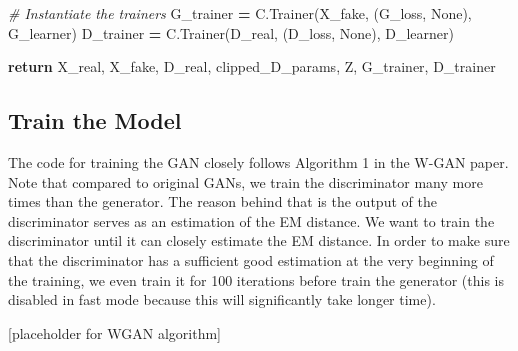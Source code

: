 \documentclass[]{book}
\newenvironment{Shaded}{\begin{snugshade}}{\end{snugshade}}
\newcommand{\CommentTok}[1]{\textcolor[rgb]{0.56,0.35,0.01}{\textit{#1}}}
\newcommand{\VariableTok}[1]{\textcolor[rgb]{0.00,0.00,0.00}{#1}}
\newcommand{\ControlFlowTok}[1]{\textcolor[rgb]{0.13,0.29,0.53}{\textbf{#1}}}
\newcommand{\OperatorTok}[1]{\textcolor[rgb]{0.81,0.36,0.00}{\textbf{#1}}}
\newcommand{\NormalTok}[1]{#1}
\theoremstyle{definition}
\theoremstyle{definition}
\theoremstyle{definition}
\theoremstyle{remark}
\begin{document}
\begin{Shaded}
\begin{Highlighting}[]
    \CommentTok{# Instantiate the trainers}
\NormalTok{    G_trainer }\OperatorTok{=}\NormalTok{ C.Trainer(X_fake,}
\NormalTok{                        (G_loss, }\VariableTok{None}\NormalTok{),}
\NormalTok{                        G_learner)}
\NormalTok{    D_trainer }\OperatorTok{=}\NormalTok{ C.Trainer(D_real,}
\NormalTok{                        (D_loss, }\VariableTok{None}\NormalTok{),}
\NormalTok{                        D_learner)}

    \ControlFlowTok{return}\NormalTok{ X_real, X_fake, D_real, clipped_D_params, Z, G_trainer, D_trainer}
\end{Highlighting}
\end{Shaded}

\subsection{Train the Model}\label{train-the-model}

The code for training the GAN closely follows Algorithm 1 in the W-GAN
paper. Note that compared to original GANs, we train the discriminator
many more times than the generator. The reason behind that is the output
of the discriminator serves as an estimation of the EM distance. We want
to train the discriminator until it can closely estimate the EM
distance. In order to make sure that the discriminator has a sufficient
good estimation at the very beginning of the training, we even train it
for 100 iterations before train the generator (this is disabled in fast
mode because this will significantly take longer time).

{[}placeholder for WGAN algorithm{]}
\end{document}
